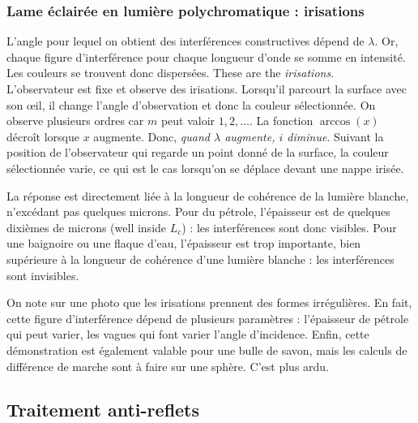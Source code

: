 \subsubsection{Lame éclairée en lumière polychromatique : irisations}

L'angle pour lequel on obtient des interférences constructives dépend de
$\lambda$. Or, chaque figure d'interférence pour chaque longueur d'onde se somme
en intensité. Les couleurs se trouvent donc dispersées. These are the
\textit{irisations}.\\

L'observateur est fixe et observe des irisations. Lorsqu'il parcourt la surface
avec son œil, il change l'angle d'observation et donc la couleur sélectionnée. On
observe plusieurs ordres car $m$ peut valoir $1, 2, \dots$. La fonction
$\arccos(x)$ décroît lorsque $x$ augmente. Donc, \emph{quand $\lambda$
augmente, $i$ diminue}. Suivant la position de l'observateur qui regarde un
point donné de la surface, la couleur sélectionnée varie, ce qui est le cas
lorsqu'on se déplace devant une nappe irisée.

\begin{conclusion}
  La réponse est directement liée à la longueur de cohérence de la lumière
  blanche, n'excédant pas quelques microns. Pour du pétrole, l'épaisseur est de
  quelques dixièmes de microns (well inside $L_c$) : les interférences sont donc
  visibles. Pour une baignoire ou une flaque d'eau, l'épaisseur est trop
  importante, bien supérieure à la longueur de cohérence d'une lumière blanche :
  les interférences sont invisibles.
\end{conclusion}

\begin{remark}
  On note sur une photo que les irisations prennent des formes irrégulières. En
  fait, cette figure d'interférence dépend de plusieurs paramètres : l'épaisseur
  de pétrole qui peut varier, les vagues qui font varier l'angle d'incidence.
  Enfin, cette démonstration est également valable pour une bulle de savon, mais
  les calculs de différence de marche sont à faire sur une sphère. C'est plus
  ardu.
\end{remark}

\subsection{Traitement anti-reflets}

